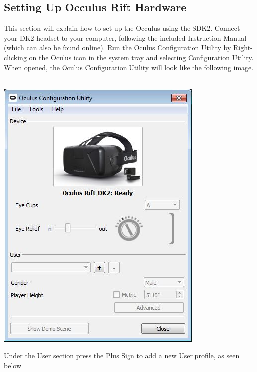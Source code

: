 \subsection{Setting Up Occulus Rift Hardware}
This section will explain how to set up the Occulus using the SDK2.
Connect your DK2 headset to your computer, following the included Instruction Manual (which can also be found online).
Run the Oculus Configuration Utility by Right-clicking on the Oculus icon in the system tray and selecting Configuration Utility. When opened, the Oculus Configuration Utility will look like the following image.\\ 
\\
\begin{center}
\centering
\includegraphics[scale=0.75]{Oculus_Config_Utility}\\
\end{center}
Under the User section press the Plus Sign to add a new User profile, as seen below\\
